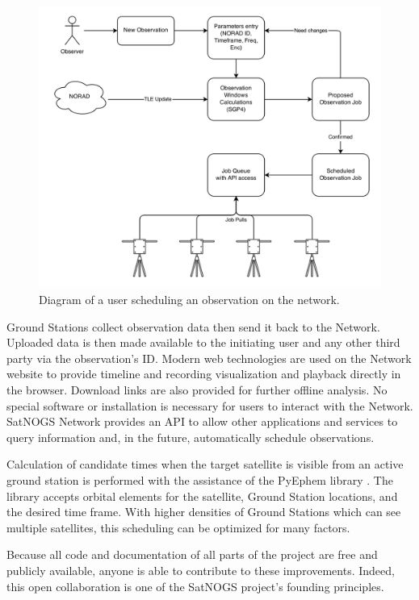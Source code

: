 \documentclass[conference,letterpaper,12pt]{IEEEtran}
\newlength{\imgwidth}
\begin{document}
\begin{figure}[htbp]
\centering
\includegraphics[width=\imgwidth]{fig/network-flow}
\caption{Diagram of a user scheduling an observation on the network.}
\label{f:network}
\end{figure}

Ground Stations collect observation data then send it back to the Network.
Uploaded data is then made available to the initiating user and any other third party via the observation's ID.
Modern web technologies are used on the Network website to provide timeline and recording visualization and playback directly in the browser.
Download links are also provided for further offline analysis.
No special software or installation is necessary for users to interact with the Network.
SatNOGS Network provides an API to allow other applications and services to query information and, in the future, automatically schedule observations.

Calculation of candidate times when the target satellite is visible from an active ground station is performed with the assistance of the PyEphem library \cite{PyEphem}.
The library accepts orbital elements for the satellite, Ground Station locations, and the desired time frame.
With higher densities of Ground Stations which can see multiple satellites, this scheduling can be optimized for many factors.

Because all code and documentation of all parts of the project are free and publicly available, anyone is able to contribute to these improvements.
Indeed, this open collaboration is one of the SatNOGS project's founding principles.
\end{document}
